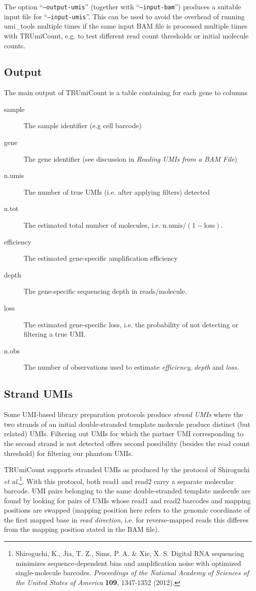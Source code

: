 \documentclass[10pt]{article}
\begin{document}
The option ``\texttt{--output-umis}'' (together with ``\texttt{--input-bam}'') produces a suitable input file for ``\texttt{--input-umis}''. This can be used to avoid the overhead of running umi\_tools multiple times if the same input BAM file is processed multiple times with TRUmiCount, e.g. to test different read count thresholds or initial molecule counts.

\subsection{Output}

The main output of TRUmiCount is a table containing for each gene to columns
\begin{description}
\item[sample] The sample identifier (e.g cell barcode)
\item[gene] The gene identifier (see discussion in \textit{Reading UMIs from a BAM File})
\item[n.umis] The number of true UMIs (i.e. after applying filters) detected
\item[n.tot] The estimated total number of molecules, i.e. $\textrm{n.umis} / (1 - \textrm{loss})$.
\item[efficiency] The estimated gene-specific amplification efficiency
\item[depth] The gene-specific sequencing depth in reads/molecule.
\item[loss] The estimated gene-specific loss, i.e. the probability of not detecting or filtering a true UMI. 
\item[n.obs] The number of observations used to estimate \textit{efficiency}, \textit{depth} and \textit{loss}.
\end{description}

\pagebreak
\subsection{Strand UMIs}

Some UMI-based library preparation protocols produce \emph{strand UMIs} where the two strands of an initial double-stranded template molecule produce distinct (but related) UMIs. Filtering out UMIs for which the partner UMI corresponding to the second strand is not detected offers second possibility (besides the read count threshold) for filtering our phantom UMIs.

TRUmiCount supports stranded UMIs as produced by the protocol of Shiroguchi \textit{et al.}\footnote{Shiroguchi, K., Jia, T. Z., Sims, P. A. \& Xie, X. S. Digital RNA sequencing minimizes sequence-dependent bias and amplification noise with optimized single-molecule barcodes. \textit{Proceedings of the National Academy of Sciences of the United States of America} \textbf{109}, 1347-1352 (2012).}. With this protocol, both read1 and read2 carry a separate molecular barcode. UMI pairs belonging to the same double-stranded template molecule are found by looking for pairs of UMIs whose read1 and read2 barcodes and mapping positions are swapped (mapping position here refers to the genomic coordinate of the first mapped base in \emph{read direction}, i.e. for reverse-mapped reads this differes from the mapping position stated in the BAM file).
\end{document}
